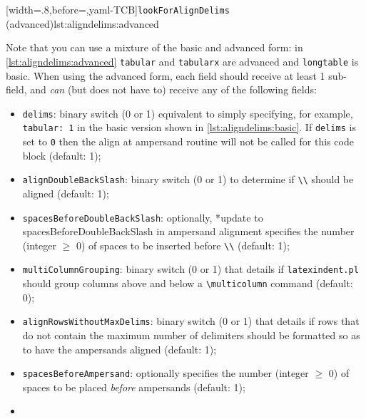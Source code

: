 \documentclass[10pt]{article}
\begin{document}
 [width=.8\linewidth,before=\centering,yaml-TCB]{\texttt{lookForAlignDelims} (advanced)}{lst:aligndelims:advanced}

 Note that you can use a mixture of the basic and advanced form: in
 \cref{lst:aligndelims:advanced} \texttt{tabular} and \texttt{tabularx} are advanced and
 \texttt{longtable} is basic. When using the advanced form, each field should receive at
 least 1 sub-field, and \emph{can} (but does not have to) receive any of the following
 fields:
 \begin{itemize}
  \item \texttt{delims}: binary switch (0 or 1) equivalent to simply specifying, for
        example, \texttt{tabular: 1} in the basic version shown in \cref{lst:aligndelims:basic}.
        If \texttt{delims} is set to \texttt{0} then the align at ampersand routine will not be
        called for this code block (default: 1);
  \item \texttt{alignDoubleBackSlash}: binary switch (0 or 1) to determine if
        \lstinline!\\!
        should be aligned (default: 1);
  \item \texttt{spacesBeforeDoubleBackSlash}: optionally,%
        *{update to spacesBeforeDoubleBackSlash in ampersand alignment}
        specifies the number (integer $\geq$ 0) of spaces to be inserted before
        \lstinline!\\! (default: 1); %
  \item {} \texttt{multiColumnGrouping}: binary
        switch (0 or 1) that details if \texttt{latexindent.pl} should group columns
        above and below a \lstinline!\multicolumn! command (default: 0);
  \item {}
        \texttt{alignRowsWithoutMaxDelims}: binary switch (0 or 1) that details if rows
        that do not contain the maximum number of delimiters should be formatted so as to
        have the ampersands aligned (default: 1);
  \item {}\texttt{spacesBeforeAmpersand}: optionally specifies the number
        (integer $\geq$ 0) of spaces to be placed \emph{before} ampersands (default: 1);
  \item {}
\end{itemize}
\end{document}
